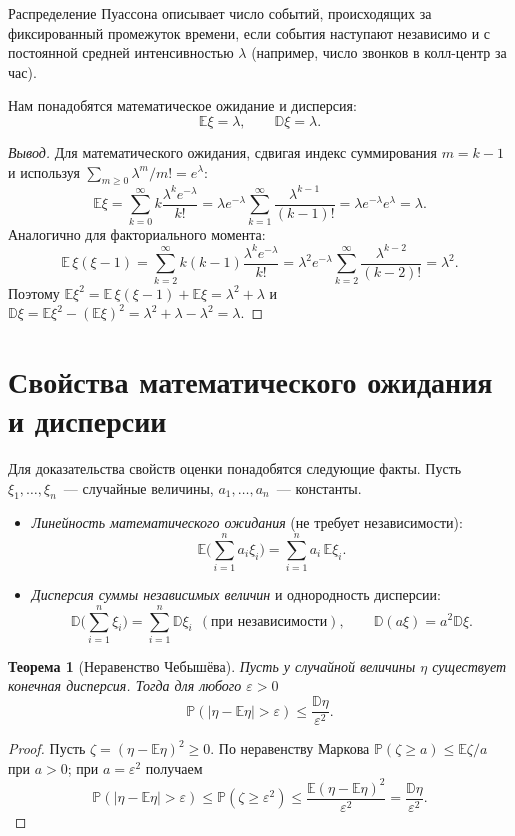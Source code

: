 \documentclass[a4paper,12pt]{article}
\theoremstyle{definition}
\theoremstyle{plain}
\newtheorem{theorem}{Теорема}
\theoremstyle{remark}
\newcommand{\E}{\mathbb{E}}
\newcommand{\D}{\mathbb{D}}
\renewcommand{\P}{\mathbb{P}}
\begin{document}
Распределение Пуассона описывает число событий, происходящих за фиксированный промежуток времени, если события наступают независимо и с постоянной средней интенсивностью $\lambda$ (например, число звонков в колл-центр за час).

Нам понадобятся математическое ожидание и дисперсия:
$$\E\xi=\lambda,\qquad \D\xi=\lambda.$$

\begin{proof}[Вывод]
Для математического ожидания, сдвигая индекс суммирования $m=k-1$ и используя $\sum_{m\ge0}\lambda^m/m!=e^\lambda$:
$$\E\xi=\sum_{k=0}^\infty k\frac{\lambda^k e^{-\lambda}}{k!}=\lambda e^{-\lambda}\sum_{k=1}^\infty\frac{\lambda^{k-1}}{(k-1)!}=\lambda e^{-\lambda}e^{\lambda}=\lambda.$$
Аналогично для факториального момента:
$$\E\,\xi(\xi-1)=\sum_{k=2}^\infty k(k-1)\frac{\lambda^k e^{-\lambda}}{k!}=\lambda^2 e^{-\lambda}\sum_{k=2}^\infty\frac{\lambda^{k-2}}{(k-2)!}=\lambda^2.$$
Поэтому $\E\xi^2=\E\,\xi(\xi-1)+\E\xi=\lambda^2+\lambda$ и
$\D\xi=\E\xi^2-(\E\xi)^2=\lambda^2+\lambda-\lambda^2=\lambda.$
\end{proof}

\section{Свойства математического ожидания и дисперсии}

Для доказательства свойств оценки понадобятся следующие факты. Пусть $\xi_1,\dots,\xi_n$~--- случайные величины, $a_1,\dots,a_n$~--- константы.
\begin{itemize}
  \item \emph{Линейность математического ожидания} (не требует независимости):
  $$\E\Big(\sum_{i=1}^n a_i\xi_i\Big)=\sum_{i=1}^n a_i\,\E\xi_i.$$
  \item \emph{Дисперсия суммы независимых величин} и однородность дисперсии:
  $$\D\Big(\sum_{i=1}^n \xi_i\Big)=\sum_{i=1}^n \D\xi_i\ \ (\text{при независимости}),\qquad \D(a\xi)=a^2\D\xi.$$
\end{itemize}

\begin{theorem}[Неравенство Чебышёва]
Пусть у случайной величины $\eta$ существует конечная дисперсия. Тогда для любого $\varepsilon>0$
$$\P\left(|\eta-\E\eta|>\varepsilon\right)\le\frac{\D\eta}{\varepsilon^2}.$$
\end{theorem}

\begin{proof}
Пусть $\zeta=(\eta-\E\eta)^2\ge0$. По неравенству Маркова $\P(\zeta\ge a)\le\E\zeta/a$ при $a>0$; при $a=\varepsilon^2$ получаем
$$\P\left(|\eta-\E\eta|>\varepsilon\right)\le\P(\zeta\ge\varepsilon^2)\le\frac{\E(\eta-\E\eta)^2}{\varepsilon^2}=\frac{\D\eta}{\varepsilon^2}.$$
\end{proof}
\end{document}
